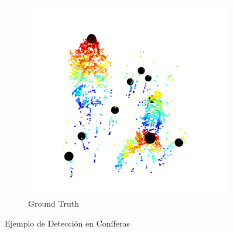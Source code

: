 \begin{figure}
\begin{subfigure}{0.5\textwidth}
  \end{subfigure}%
  
  \begin{subfigure}{0.5\textwidth}
    \centering
    \includegraphics[width=0.9\linewidth]{imaxes/groundT.png}
    \caption{Ground Truth}
  \end{subfigure}
    
  \caption{Ejemplo de Detección en Coníferas}
  \label{detecAna}
\end{figure}

